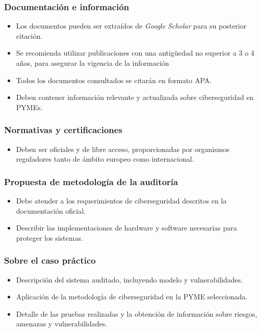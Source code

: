 \documentclass[a4paper, 10pt]{article}
\begin{document}
\subsubsection{Documentación e información}
\begin{itemize}
    \item Los documentos pueden ser extraídos de \textit{Google Scholar} para su posterior citación.
    \item Se recomienda utilizar publicaciones con una antigüedad no superior a 3 o 4 años, para asegurar la vigencia de la información
    \item Todos los documentos consultados se citarán en formato APA.
    \item Deben contener información relevante y actualizada sobre ciberseguridad en PYMEs.
\end{itemize}

\subsubsection{Normativas y certificaciones}
\begin{itemize}
    \item Deben ser oficiales y de libre acceso, proporcionadas por organismos reguladores tanto de ámbito europeo como internacional.
\end{itemize}

\subsubsection{Propuesta de metodología de la auditoría}
\begin{itemize}
    \item Debe atender a los requerimientos de ciberseguridad descritos en la documentación oficial.
    \item Describir las implementaciones de hardware y software necesarias para proteger los sistemas.
\end{itemize}

\subsubsection{Sobre el caso práctico}
\begin{itemize}
    \item Descripción del sistema auditado, incluyendo modelo y vulnerabilidades.
    \item Aplicación de la metodología de ciberseguridad en la PYME seleccionada.
    \item Detalle de las pruebas realizadas y la obtención de información sobre riesgos, amenazas y vulnerabilidades.
\end{itemize}
\end{document}
